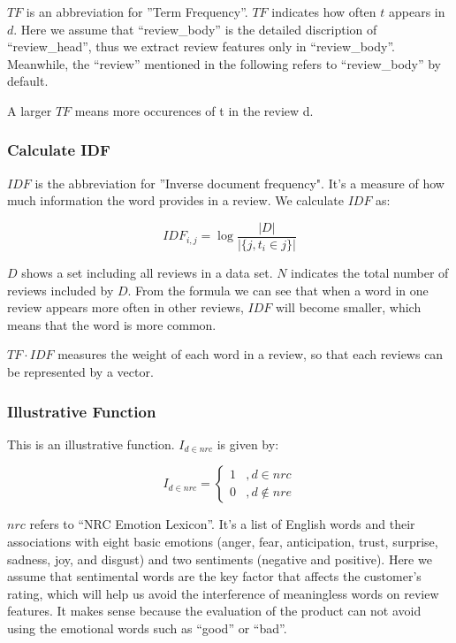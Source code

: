\documentclass[12pt,a4paper,]{article}
\begin{document}
\(TF\) is an abbreviation for ''Term Frequency''. \(TF\) indicates how
often \(t\) appears in \(d\). Here we assume that ``review\_body'' is
the detailed discription of ``review\_head'', thus we extract review
features only in ``review\_body''. Meanwhile, the ``review'' mentioned
in the following refers to ``review\_body'' by default.

A larger \(TF\) means more occurences of t in the review d.

\hypertarget{calculate-idf}{%
\subsubsection{Calculate IDF}\label{calculate-idf}}

\(IDF\) is the abbreviation for ''Inverse document frequency". It's a
measure of how much information the word provides in a review. We
calculate \(IDF\) as:

\begin{equation}
IDF_{i,j}=\log \frac{\left\vert D \right\vert}{\left\vert\{ j,t_i\in j \}\right\vert}
\end{equation}

\(D\) shows a set including all reviews in a data set. \(N\) indicates
the total number of reviews included by \(D\). From the formula we can
see that when a word in one review appears more often in other reviews,
\(IDF\) will become smaller, which means that the word is more common.

\(TF \cdot IDF\) measures the weight of each word in a review, so that
each reviews can be represented by a vector.

\hypertarget{illustrative-function}{%
\subsubsection{Illustrative Function}\label{illustrative-function}}

This is an illustrative function. \(I_{d\in nrc}\) is given by:

\begin{equation}
I_{d\in nrc}=\left\{\begin{array}{ll}
    1 & , d \in nrc \\
    0 & , d \notin nre
    \end{array}\right.
\end{equation}

\(nrc\) refers to ``NRC Emotion Lexicon''. It's a list of English words
and their associations with eight basic emotions (anger, fear,
anticipation, trust, surprise, sadness, joy, and disgust) and two
sentiments (negative and positive). Here we assume that sentimental
words are the key factor that affects the customer's rating, which will
help us avoid the interference of meaningless words on review features.
It makes sense because the evaluation of the product can not avoid using
the emotional words such as ``good'' or ``bad''.
\end{document}
